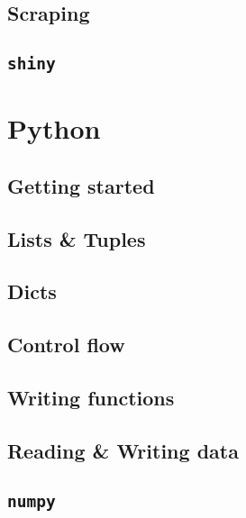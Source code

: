 \documentclass[
]{book}
\begin{document}
\hypertarget{r-scraping}{%
\section{Scraping}\label{r-scraping}}

\hypertarget{r-shiny}{%
\section{\texorpdfstring{\texttt{shiny}}{shiny}}\label{r-shiny}}

\hypertarget{python}{%
\chapter{Python}\label{python}}

\hypertarget{getting-started-with-python}{%
\section{Getting started}\label{getting-started-with-python}}

\hypertarget{p-lists-and-tuples}{%
\section{Lists \& Tuples}\label{p-lists-and-tuples}}

\hypertarget{p-dicts}{%
\section{Dicts}\label{p-dicts}}

\hypertarget{p-control-flow}{%
\section{Control flow}\label{p-control-flow}}

\hypertarget{p-writing-functions}{%
\section{Writing functions}\label{p-writing-functions}}

\hypertarget{p-reading-and-writing-data}{%
\section{Reading \& Writing data}\label{p-reading-and-writing-data}}

\hypertarget{p-numpy}{%
\section{\texorpdfstring{\texttt{numpy}}{numpy}}\label{p-numpy}}
\end{document}
